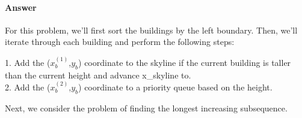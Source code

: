 \documentclass{article}
\begin{document}
\paragraph{Answer}

For this problem, we'll first sort the buildings by the left boundary. Then, we'll
iterate through each building and perform the following steps:

1. Add the ($x_b^{(1)}$,$y_b$) coordinate to the skyline if the current building is taller than the current height and advance
x_{skyline} to.\\
2. Add the ($x_b^{(2)}$,$y_b$) coordinate to a priority queue based on the height.


\todo{}

\collab{}

Next, we consider the problem of finding the longest increasing subsequence.
\end{document}
